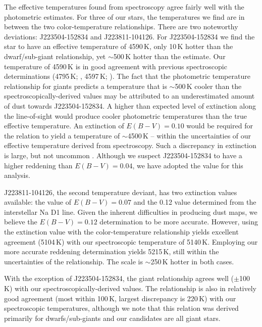 \documentclass{emulateapj}
\begin{document}
The effective temperatures found from spectroscopy agree fairly well with the photometric estimates. For three of our stars, the temperatures we find are in between the two color-temperature relationships. There are two noteworthy deviations: J223504-152834 and J223811-104126. For J223504-152834 we find the star to have an effective temperature of 4590\,K, only 10\,K hotter than the \citet{casagrande;et-al_2010} dwarf/sub-giant relationship, yet ${\sim}$500\,K hotter than the \citet{alonso;et-al_1999} estimate. Our temperature of 4590\,K is in good agreement with previous spectroscopic determinations (4795\,K; \citet{williams;et-al_2011}, 4597\,K; \citet{wylie-de-boer;et-al_2012}). The fact that the \citet{alonso;et-al_1999} photometric temperature relationship for giants predicts a temperature that is ${\sim}$500\,K cooler than the spectroscopically-derived values may be attributed to an underestimated amount of dust towards J223504-152834. A higher than expected level of extinction along the line-of-sight would produce cooler photometric temperatures than the true effective temperature.  An extinction of $E(B-V) = 0.10$ would be required for the \citet{alonso;et-al_1999} relation to yield a temperature of ${\sim}$4500\,K \--- within the uncertainties of our effective temperature derived from spectroscopy. Such a discrepancy in extinction is large, but not uncommon \citep[e.g. see][]{peek;graves_2010,nataf;et-al_2012}. Although we suspect J223504-152834 to have a higher reddening than $E(B-V) = 0.04$, we have adopted the \citet{schlegel;et-al_1998} value for this analysis.

J223811-104126, the second temperature deviant, has two extinction values available: the \citet{schlegel;et-al_1998} value of $E(B-V) = 0.07$ and the 0.12 value determined from the interstellar Na D1 line. Given the inherent difficulties in producing dust maps, we believe the $E(B-V) = 0.12$ determination to be more accurate. However, using the \citet{schlegel;et-al_1998} extinction value with the \citet{alonso;et-al_1999} color-temperature relationship yields excellent agreement (5104\,K) with our spectroscopic temperature of 5140\,K. Employing our more accurate reddening determination yields 5215\,K, still within the uncertainties of the relationship. The \citet{casagrande;et-al_2010} scale is ${\sim}$250\,K hotter in both cases.

With the exception of J223504-152834, the \citet{alonso;et-al_1999} giant relationship agrees well ($\pm$100\,K) with our spectroscopically-derived values. The \citet{casagrande;et-al_2010} relationship is also in relatively good agreement (most within 100\,K, largest discrepancy is 220\,K) with our spectroscopic temperatures, although we note that this relation was derived primarily for dwarfs/sub-giants and our candidates are all giant stars.
\end{document}
